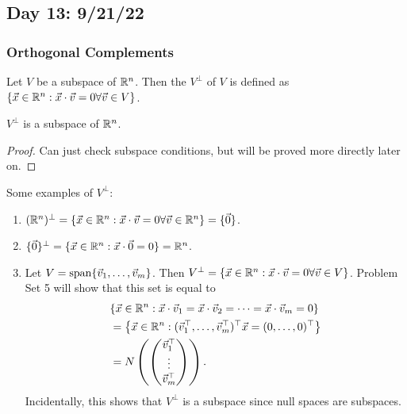 \documentclass[main.tex]{subfiles}
\begin{document}
\subsection{Day 13: 9/21/22}
\subsubsection{Orthogonal Complements}
\begin{definition}
    Let $V$ be a subspace of $\mathbb R^n$. Then the  $V^\perp$ of $V$ is defined as $\{\vec{x}\in \mathbb R^n : \vec{x}\cdot \vec{v} = 0\forall \vec{v}\in V\}$.
\end{definition}

\begin{proposition}
    $V^\perp$ is a subspace of $\mathbb R^n$.
\end{proposition}
\begin{proof}
    Can just check subspace conditions, but will be proved more directly later on.
\end{proof}

Some examples of $V^\perp$:
\begin{enumerate}
    \item $(\mathbb R^n)^\perp = \{\vec{x} \in \mathbb R^n :  \vec{x}\cdot \vec{v} = 0\forall \vec{v}\in \mathbb R^n\} = \{\vec{0}\}$.
    \item $\{\vec{0}\}^\perp = \{\vec{x} \in \mathbb R^n :  \vec{x}\cdot \vec{0} = 0\} = \mathbb R^n$.
    \item Let $V = \operatorname{span}\{\vec{v}_1, \ldots , \vec{v}_m\}$. Then $V^\perp = \{\vec{x} \in \mathbb R^n :  \vec{x}\cdot \vec{v} = 0\forall \vec{v}\in V\}$. Problem Set 5 will show that this set is equal to
    \begin{align*}
    &\{\vec{x} \in \mathbb R^n : \vec{x}\cdot \vec{v}_1 = \vec{x}\cdot \vec{v}_2 = \cdots = \vec{x}\cdot \vec{v}_m = 0\} \\
    &=\left\{\vec{x}\in \mathbb R^n : (\vec{v}_1^\top, \ldots , \vec{v}_m^\top)^\top \vec{x} = (0, \ldots , 0)^\top \right\} \\
    &= N\left(\begin{pmatrix}
        \vec{v}_1^\top \\
        \vdots \\
        \vec{v}_m^\top
    \end{pmatrix}\right).
    \end{align*}Incidentally, this shows that $V^\perp$ is a subspace since null spaces are subspaces.
\end{enumerate}
\end{document}
